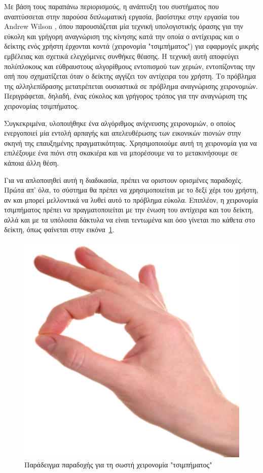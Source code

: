 Με βάση τους παραπάνω περιορισμούς, η ανάπτυξη του συστήματος που αναπτύσσεται στην παρούσα διπλωματική εργασία, βασίστηκε στην εργασία του Andrew Wilson \cite{Wilson2006}, όπου παρουσιάζεται μία τεχνική υπολογιστικής όρασης για την εύκολη και γρήγορη αναγνώριση της κίνησης κατά την οποία ο αντίχειρας και ο δείκτης ενός χρήστη έρχονται κοντά (χειρονομία "τσιμπήματος") για εφαρμογές μικρής εμβέλειας και σχετικά ελεγχόμενες συνθήκες θέασης. Η τεχνική αυτή αποφεύγει πολύπλοκους και εύθραυστους αλγορίθμους εντοπισμού των χεριών, εντοπίζοντας την οπή που σχηματίζεται όταν ο δείκτης αγγίζει τον αντίχειρα του χρήστη. Το πρόβλημα της αλληλεπίδρασης μετατρέπεται ουσιαστικά σε πρόβλημα αναγνώρισης χειρονομιών. Περιγράφεται, δηλαδή, ένας εύκολος και γρήγορος τρόπος για την αναγνώριση της χειρονομίας τσιμπήματος. 


Συγκεκριμένα, υλοποιήθηκε ένα αλγόριθμος ανίχνευσης χειρονομιών, ο οποίος ενεργοποιεί μία εντολή αρπαγής και απελευθέρωσης των εικονικών πιονιών στην σκηνή της επαυξημένης πραγματικότητας. Χρησιμοποιούμε αυτή τη χειρονομία για να επιλέξουμε ένα πιόνι στη σκακιέρα και να μπορέσουμε να το μετακινήσουμε σε κάποια άλλη θέση.


Για να απλοποιηθεί αυτή η διαδικασία, πρέπει να οριστουν ορισμένες παραδοχές.
Πρώτα απ' όλα, το σύστημα θα πρέπει να χρησιμοποιείται με το δεξί χέρι του χρήστη, αν και μπορεί μελλοντικά να λυθεί αυτό το πρόβλημα εύκολα. Επιπλέον, η χειρονομία τσιμπήματος πρέπει να πραγματοποιείται με την ένωση του αντίχειρα και του δείκτη, αλλά και με τα υπόλοιπα δάκτυλα να είναι τεντωμένα και όσο γίνεται πιο κάθετα στο δείκτη, όπως φαίνεται στην εικόνα~\ref{fig:gesture_rec1}.

\begin{figure}[H]
    \centering
    \includegraphics[scale=0.6, angle=0]{Files/Figures/correct_pinch.pdf}
    \caption[Παράδειγμα παραδοχής για τη σωστή χειρονομία "τσιμπήματος"]{Παράδειγμα παραδοχής για τη σωστή χειρονομία "τσιμπήματος"}
    \label{fig:gesture_rec1}
\end{figure}



